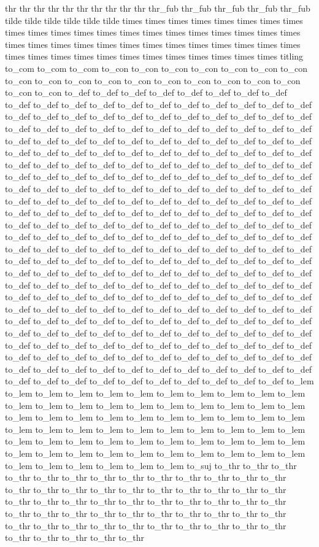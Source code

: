 thr thr thr thr thr thr thr thr thr thr thr_fub thr_fub thr_fub thr_fub thr_fub tilde tilde tilde tilde tilde tilde times times times times times times times times times times times times times times times times times times times times times times times times times times times times times times times times times times times times times times times times times times times times times times titling to_com to_com to_com to_con to_con to_con to_con to_con to_con to_con to_con to_con to_con to_con to_con to_con to_con to_con to_con to_con to_con to_con to_def to_def to_def to_def to_def to_def to_def to_def to_def to_def to_def to_def to_def to_def to_def to_def to_def to_def to_def to_def to_def to_def to_def to_def to_def to_def to_def to_def to_def to_def to_def to_def to_def to_def to_def to_def to_def to_def to_def to_def to_def to_def to_def to_def to_def to_def to_def to_def to_def to_def to_def to_def to_def to_def to_def to_def to_def to_def to_def to_def to_def to_def to_def to_def to_def to_def to_def to_def to_def to_def to_def to_def to_def to_def to_def to_def to_def to_def to_def to_def to_def to_def to_def to_def to_def to_def to_def to_def to_def to_def to_def to_def to_def to_def to_def to_def to_def to_def to_def to_def to_def to_def to_def to_def to_def to_def to_def to_def to_def to_def to_def to_def to_def to_def to_def to_def to_def to_def to_def to_def to_def to_def to_def to_def to_def to_def to_def to_def to_def to_def to_def to_def to_def to_def to_def to_def to_def to_def to_def to_def to_def to_def to_def to_def to_def to_def to_def to_def to_def to_def to_def to_def to_def to_def to_def to_def to_def to_def to_def to_def to_def to_def to_def to_def to_def to_def to_def to_def to_def to_def to_def to_def to_def to_def to_def to_def to_def to_def to_def to_def to_def to_def to_def to_def to_def to_def to_def to_def to_def to_def to_def to_def to_def to_def to_def to_def to_def to_def to_def to_def to_def to_def to_def to_def to_def to_def to_def to_def to_def to_def to_def to_def to_def to_def to_def to_def to_def to_def to_def to_def to_def to_def to_def to_def to_def to_def to_def to_def to_def to_def to_def to_def to_def to_def to_def to_def to_def to_def to_def to_def to_def to_def to_def to_def to_def to_def to_def to_def to_def to_def to_def to_def to_def to_def to_def to_def to_def to_def to_def to_def to_def to_def to_def to_def to_def to_def to_def to_def to_def to_def to_def to_lem to_lem to_lem to_lem to_lem to_lem to_lem to_lem to_lem to_lem to_lem to_lem to_lem to_lem to_lem to_lem to_lem to_lem to_lem to_lem to_lem to_lem to_lem to_lem to_lem to_lem to_lem to_lem to_lem to_lem to_lem to_lem to_lem to_lem to_lem to_lem to_lem to_lem to_lem to_lem to_lem to_lem to_lem to_lem to_lem to_lem to_lem to_lem to_lem to_lem to_lem to_lem to_lem to_lem to_lem to_lem to_lem to_lem to_lem to_lem to_lem to_lem to_lem to_lem to_lem to_lem to_lem to_suj to_thr to_thr to_thr to_thr to_thr to_thr to_thr to_thr to_thr to_thr to_thr to_thr to_thr to_thr to_thr to_thr to_thr to_thr to_thr to_thr to_thr to_thr to_thr to_thr to_thr to_thr to_thr to_thr to_thr to_thr to_thr to_thr to_thr to_thr to_thr to_thr to_thr to_thr to_thr to_thr to_thr to_thr to_thr to_thr to_thr to_thr to_thr to_thr to_thr to_thr to_thr to_thr to_thr to_thr to_thr to_thr to_thr to_thr 